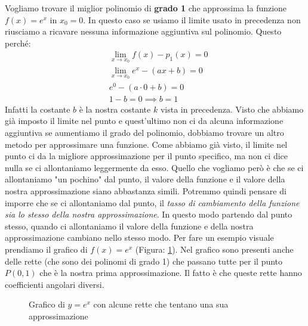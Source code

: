 Vogliamo trovare il miglior polinomio di \textbf{grado 1} che approssima la funzione $f(x) = e^x$ in $x_0 = 0$. In questo caso se usiamo il limite usato in precedenza non riusciamo a ricavare nessuna informazione aggiuntiva sul polinomio. Questo perché:
\begin{align*}
	&\lim_{x \to x_0} f(x) - p_1(x) = 0\\
	&\lim_{x \to x_0} e^x - (ax + b) = 0\\
	&e^0 - (a \cdot 0 + b) = 0\\
	&1 - b = 0 \implies b = 1
\end{align*}
Infatti la costante $b$ è la nostra costante $k$ vista in precedenza. Visto che abbiamo già imposto il limite nel punto e quest'ultimo non ci da alcuna informazione aggiuntiva se aumentiamo il grado del polinomio, dobbiamo trovare un altro metodo per approssimare una funzione. Come abbiamo già visto, il limite nel punto ci da la migliore approssimazione per il punto specifico, ma non ci dice nulla se ci allontaniamo leggermente da esso. Quello che vogliamo però è che se ci allontaniamo "un pochino" dal punto, il valore della funzione e il valore della nostra approssimazione siano abbastanza simili. Potremmo quindi pensare di imporre che se ci allontaniamo dal punto, il \textit{tasso di cambiamento della funzione sia lo stesso della nostra approssimazione}. In questo modo partendo dal punto stesso, quando ci allontaniamo il valore della funzione e della nostra approssimazione cambiano nello stesso modo. Per fare un esempio visuale prendiamo il grafico di $f(x) = e^x$ (Figura: \ref{fig:EsponenzialeGrafico}). Nel grafico sono presenti anche delle rette (che sono dei polinomi di grado 1) che passano tutte per il punto $P(0, 1)$ che è la nostra prima approssimazione. Il fatto è che queste rette hanno coefficienti angolari diversi.

\begin{figure}[h]
\centering
{}
\caption{Grafico di $y = e^x$ con alcune rette che tentano una sua approssimazione}
	\label{fig:EsponenzialeGrafico}
\end{figure}




